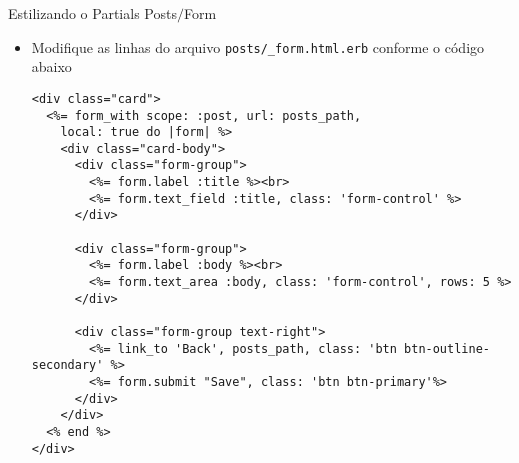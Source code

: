 \begin{frame}{Estilizando o Partials Posts$/$Form}
    \begin{itemize}
      \item Modifique as linhas do arquivo \verb|posts/_form.html.erb| conforme o código abaixo
      \begin{lstlisting}[style=RubyInputStyle, basicstyle=\tiny\ttfamily, caption=app/views/posts/\_form.html.erb]
<div class="card">
  <%= form_with scope: :post, url: posts_path, 
    local: true do |form| %>
    <div class="card-body">
      <div class="form-group">
        <%= form.label :title %><br>
        <%= form.text_field :title, class: 'form-control' %>
      </div>
      
      <div class="form-group">
        <%= form.label :body %><br>
        <%= form.text_area :body, class: 'form-control', rows: 5 %>
      </div>
      
      <div class="form-group text-right">
        <%= link_to 'Back', posts_path, class: 'btn btn-outline-secondary' %>
        <%= form.submit "Save", class: 'btn btn-primary'%>
      </div>
    </div>
  <% end %>	
</div>
    \end{lstlisting}
  \end{itemize}
\end{frame} 